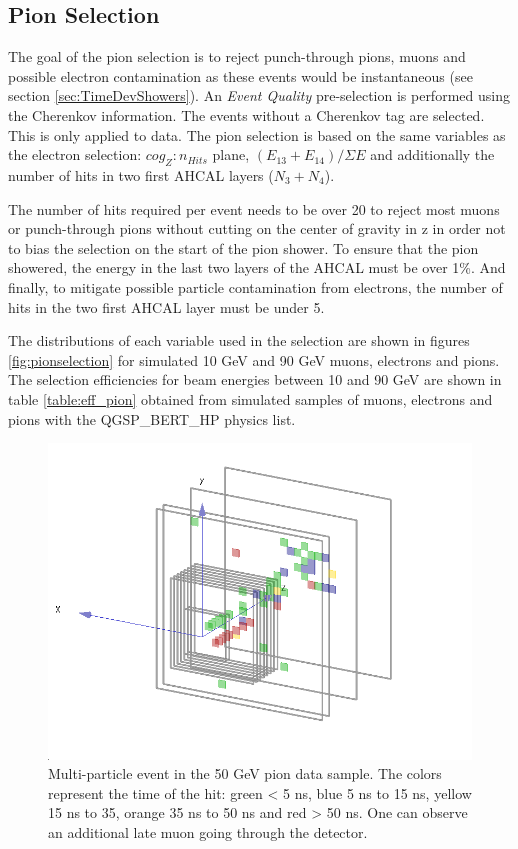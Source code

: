 \subsection{Pion Selection}
\label{sec:pionsel}

The goal of the pion selection is to reject punch-through pions, muons and possible electron contamination as these events would be instantaneous (see section \ref{sec:TimeDevShowers}). An \textit{Event Quality} pre-selection is performed using the Cherenkov information. The events without a Cherenkov tag are selected. This is only applied to data. The pion selection is based on the same variables as the electron selection: $cog_Z:n_{Hits}$ plane, $(E_{13}+E_{14})/\Sigma E$ and additionally the number of hits in two first AHCAL layers ($N_3+N_4$).

The number of hits required per event needs to be over 20 to reject most muons or punch-through pions without cutting on the center of gravity in z in order not to bias the selection on the start of the pion shower. To ensure that the pion showered, the energy in the last two layers of the AHCAL must be over 1\%. And finally, to mitigate possible particle contamination from electrons, the number of hits in the two first AHCAL layer must be under 5.

The distributions of each variable used in the selection are shown in figures \ref{fig:pionselection} for simulated 10 GeV and 90 GeV muons, electrons and pions. The selection efficiencies for beam energies between 10 and 90 GeV are shown in table \ref{table:eff_pion} obtained from simulated samples of muons, electrons and pions with the QGSP\_BERT\_HP physics list.

\begin{figure}[htbp!]
	\centering
	\includegraphics[width=0.7\linewidth]{chap5/fig_AHCAL_timing/Pions/DoubleParticleEventPions.png}
	\caption{Multi-particle event in the 50 GeV pion data sample. The colors represent the time of the hit: green < 5 ns, blue 5 ns to 15 ns, yellow 15 ns to 35, orange 35 ns to 50 ns and red > 50 ns. One can observe an additional late muon going through the detector.} \label{fig:DoubleParticleEvent}
\end{figure}

